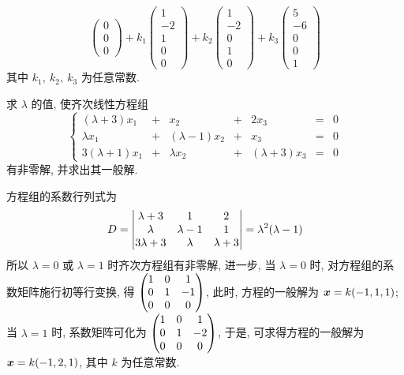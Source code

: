 \begin{solution}
\begin{enumerate}[label=(\arabic{*})]
$$\begin{pmatrix}
                      0  \\
                      0  \\
                      0
                  \end{pmatrix}+k_1\begin{pmatrix}
                      1  \\
                      -2 \\
                      1  \\
                      0  \\
                      0
                  \end{pmatrix}+k_2\begin{pmatrix}
                      1  \\
                      -2 \\
                      0  \\
                      1  \\
                      0
                  \end{pmatrix}+k_3\begin{pmatrix}
                      5  \\
                      -6 \\
                      0  \\
                      0  \\
                      1
                  \end{pmatrix}$$
              其中 $k_1,~k_2,~k_3$ 为任意常数.
    \end{enumerate}
\end{solution}

\begin{example}
    求 $\lambda$ 的值, 使齐次线性方程组
    $$\left\{\begin{matrix}
            (\lambda +3)x_1  & + & x_2             & + & 2x_3            & = & 0 \\
            \lambda x_1      & + & (\lambda -1)x_2 & + & x_3             & = & 0 \\
            3(\lambda +1)x_1 & + & \lambda x_2     & + & (\lambda +3)x_3 & = & 0
        \end{matrix}\right.$$ 有非零解, 并求出其一般解.
\end{example}
\begin{solution}
    方程组的系数行列式为 $$D=\mqty|\lambda +3&1&2\\\lambda&\lambda-1&1\\3\lambda+3&\lambda&\lambda +3|=\lambda^2(\lambda-1)$$
    所以 $\lambda=0$ 或 $\lambda=1$ 时齐次方程组有非零解, 进一步, 当 $\lambda=0$ 时, 对方程组的系数矩阵施行初等行变换, 得
    $\mqty(1&0&1\\0&1&-1\\0&0&0)$, 此时, 方程的一般解为 $\vb*{x}=k(-1,1,1)$; 当 $\lambda=1$ 时, 系数矩阵可化为
    $\mqty(1&0&1\\0&1&-2\\0&0&0)$, 于是, 可求得方程的一般解为 $\vb*{x}=k(-1,2,1)$, 其中 $k$ 为任意常数.
\end{solution}

